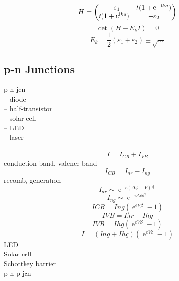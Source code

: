 \documentclass[UTF8]{ctexart} %
\DeclareMathOperator{\e}{\mathrm{e}}
\renewcommand{\I}{\mathrm{i}}
\numberwithin{equation}{section}
\begin{document}
\begin{equation}\label{key}
H = \mqty(-\varepsilon_1 & t(1 + \e^{-\I ka})\\
		t(1 + \e^{\I ka}) & -\varepsilon_2)
\end{equation}
\begin{equation}\label{key}
\det(H - E_k I) = 0
\end{equation}
\begin{equation}\label{key}
E_k = \dfrac{1}{2}(\varepsilon_1 + \varepsilon_2) \pm \sqrt{...}
\end{equation}

\subsection{p-n Junctions}
p-n jcn\\
-- diode\\
-- half-transistor\\
-- solar cell\\
-- LED\\
-- laser\\
~\\

\begin{equation}\label{key}
I = I_{CB} + I_{VB}
\end{equation}
conduction band, valence band
\begin{equation}\label{key}
I_{CB} = I_{nr} - I_{ng}
\end{equation}
recomb, generation
\begin{equation}\label{key}
I_{nr} \sim \e^{-e(\Delta\phi - V)\beta}
\end{equation}
\begin{equation}\label{key}
I_{ng} \sim \e^{-e\Delta\phi\beta}
\end{equation}
\begin{equation}\label{key}
ICB = Ing(\e^{eV\beta} - 1)
\end{equation}
\begin{equation}\label{key}
IVB = Ihr - Ihg
\end{equation}
\begin{equation}\label{key}
IVB = Ihg(\e^{eV\beta} - 1)
\end{equation}
\begin{equation}\label{key}
I = (Ing + Ihg)(\e^{eV\beta} - 1)
\end{equation}
LED\\
Solar cell\\
Schottkey barrier\\
p-n-p jcn
\end{document}

